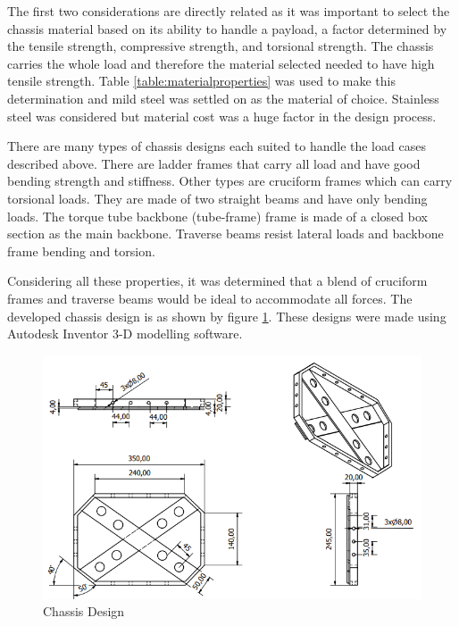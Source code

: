 The first two considerations are directly related as it was important to select the chassis material based on its ability to handle a payload, a factor determined by the tensile strength, compressive strength, and torsional strength. The chassis carries the whole load and therefore the material selected needed to have high tensile strength. Table \ref{table:materialproperties} was used to make this determination and mild steel was settled on as the material of choice. Stainless steel was considered but material cost was a huge factor in the design process.
\par
There are many types of chassis designs each suited to handle the load cases described above. There are ladder frames that carry all load and have good bending strength and stiffness. Other types are cruciform frames which can carry torsional loads. They are made of two straight beams and have only bending loads. The torque tube backbone (tube-frame) frame is made of a closed box section as the main backbone. Traverse beams resist lateral loads and backbone frame bending and torsion. 
\par
Considering all these properties, it was determined that a blend of cruciform frames and traverse beams would be ideal to accommodate all forces. The developed chassis design is as shown by figure \ref{fig:newchassis}. These designs were made using Autodesk Inventor 3-D modelling software.

\begin{figure}[H]
    \centering
    \includegraphics[scale = 0.8]{Figures/NewChassisDWG.png}
    \caption{Chassis Design}
    \label{fig:newchassis}
\end{figure}

